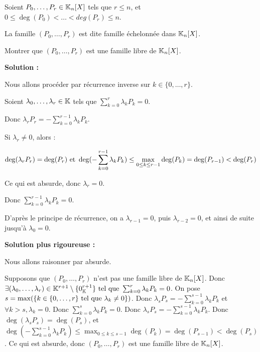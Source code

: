 \documentclass[12pt, a4paper]{report}
\begin{document}
\begin{exercise}
    Soient $P_0,\dots,P_r \in \mathbb{K}_n[X]$ tels que $r \le n$, et $0 \le \deg(P_0) < \dots < deg(P_r) \le n$. 
    
    La famille $(P_0,\dots,P_r)$ est dite famille échelonnée dans $\mathbb{K}_n[X]$.
    
    Montrer que $(P_0,\dots,P_r)$ est une famille libre de $\mathbb{K}_n[X]$.

    \textbf{Solution :}

    Nous allons procéder par récurrence inverse sur $k \in \{0,\dots,r\}$.

    Soient $\lambda_0,\dots,\lambda_r \in \mathbb{K}$ tels que $\sum_{k=0}^r \lambda_k P_k = 0$.

    Donc $\lambda_r P_r = -\sum_{k=0}^{r-1} \lambda_k P_k$.

    Si $\lambda_r \ne 0$, alors :

    $$\deg(\lambda_r P_r) = \deg(P_r) \text{ et } \deg(-\sum_{k=0}^{r-1} \lambda_k P_k) \le \max_{0 \le k \le r-1} \deg(P_k) = \deg(P_{r-1}) < \deg(P_r)$$

    Ce qui est absurde, donc $\lambda_r = 0$.
    
    Donc $\sum_{k=0}^{r-1} \lambda_k P_k = 0$.

    D'après le principe de récurrence, on a $\lambda_{r-1} = 0$, puis $\lambda_{r-2} = 0$, et ainsi de suite jusqu'à $\lambda_0 = 0$.

    \textbf{Solution plus rigoureuse :}

    Nous allons raisonner par absurde.

    \begin{outline}
        \1 Supposons que $(P_0,\dots,P_r)$ n'est pas une famille libre de $\mathbb{K}_n[X]$.
        \1 Donc $\exists (\lambda_0,\dots,\lambda_r) \in \mathbb{K}^{r+1}\setminus\{0_{\mathbb{K}}^{r+1}\} \text{ tel que } \sum_{k=0}^r \lambda_k P_k = 0$.
        \1 On pose $s = \max(\{ k \in \{0,\dots,r\} \text{ tel que } \lambda_k \ne 0\})$.
        \1 Donc $\lambda_s P_s = -\sum_{k=0}^{s-1} \lambda_k P_k$ et $\forall k > s, \lambda_k = 0$.
        \1 Donc $\sum_{k=0}^s \lambda_k P_k = 0$.
        \1 Donc $\lambda_s P_s = -\sum_{k=0}^{s-1} \lambda_k P_k$.
        \1 Donc $\deg(\lambda_s P_s) = \deg(P_s)$, et $\deg(-\sum_{k=0}^{s-1} \lambda_k P_k) \le \max_{0 \le k \le s-1} \deg(P_k) = \deg(P_{s-1}) < \deg(P_s)$.
        \1 Ce qui est absurde, donc $(P_0,\dots,P_r)$ est une famille libre de $\mathbb{K}_n[X]$.
    \end{outline}
    \label{exo:famille_echelonnee_libre}
\end{exercise}
\end{document}
